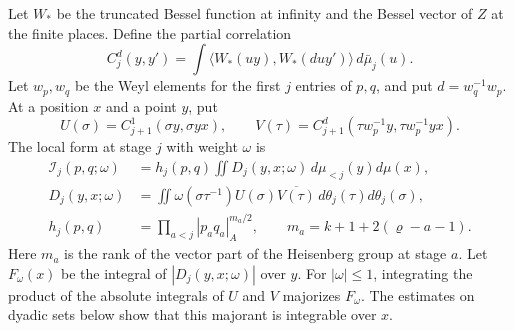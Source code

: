 Let \(W_\ast\) be the truncated Bessel function at infinity and the
Bessel vector of \(Z\) at the finite places. Define the partial correlation
\[
 C_j^d(y,y')=\int
  \langle W_\ast(u y),W_\ast(d u y')\rangle\,d\bar\mu_j(u).
\]
Let \(w_p,w_q\) be the Weyl elements for the first \(j\) entries of
\(p,q\), and put \(d=w_q^{-1}w_p\). At a position \(x\) and a point \(y\),
put
\[
 U(\sigma)=C_{j+1}^1(\sigma y,\sigma yx),\qquad
 V(\tau)=C_{j+1}^{d}(\tau w_p^{-1}y,\tau w_p^{-1}yx).
\]
The local form at stage \(j\) with weight \(\omega\) is
\begin{equation}\label{eq:span-local-form}
 \begin{split}
 \mathcal I_j(p,q;\omega)
 &=h_j(p,q)\iint
       D_j(y,x;\omega)\,d\mu_{<j}(y)d\mu(x),\\
 D_j(y,x;\omega)
 &=\iint \omega(\sigma\tau^{-1})U(\sigma)\overline{V(\tau)}
                           \,d\theta_j(\tau)d\theta_j(\sigma),\\
 h_j(p,q)&=\prod_{a<j}|p_a q_a|_A^{m_a/2},\qquad
 m_a=k+1+2(\varrho-a-1).
 \end{split}
\end{equation}
Here \(m_a\) is the rank of the vector part of the Heisenberg group
at stage \(a\). Let \(F_\omega(x)\) be the integral of
\(|D_j(y,x;\omega)|\) over \(y\). For \(|\omega|\le1\), integrating the
product of the absolute integrals of \(U\) and \(V\) majorizes
\(F_\omega\). The estimates on dyadic sets below show that this majorant
is integrable over \(x\).

